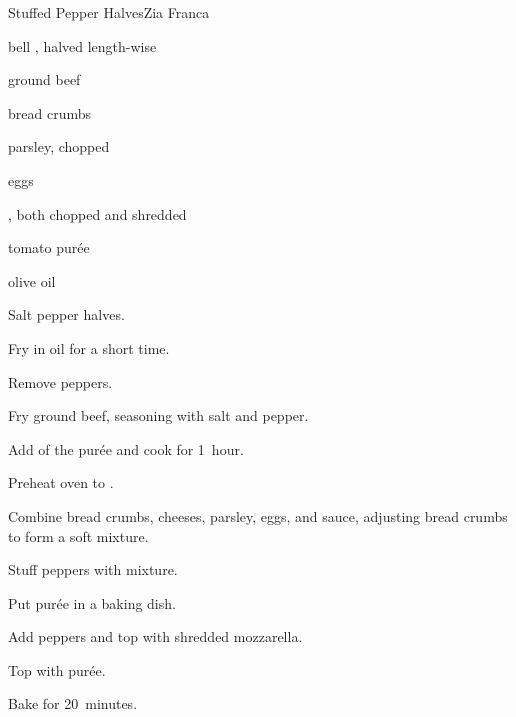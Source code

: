 \begin{recipe}{Stuffed Pepper Halves}{Zia Franca}{}

\begin{ingredients}
\item bell , halved length-wise
\item ground beef
\item bread crumbs
\item {}
\item parsley, chopped
\item eggs
\item {}, both chopped and shredded
\item tomato pur\'ee
\item olive oil
\end{ingredients}

\begin{directions}
\item Salt pepper halves.
\item Fry in oil for a short time.
\item Remove peppers.
\item Fry ground beef, seasoning with salt and pepper.
\item Add \half{} of the pur\'ee and cook for 1~hour.
\item Preheat oven to .
\item Combine bread crumbs, cheeses, parsley, eggs, and sauce, adjusting bread crumbs to form a soft mixture.
\item Stuff peppers with mixture.
\item Put pur\'ee in a baking dish.
\item Add peppers and top with shredded mozzarella.
\item Top with pur\'ee.
\item Bake for 20~minutes.
\end{directions}

\end{recipe}
